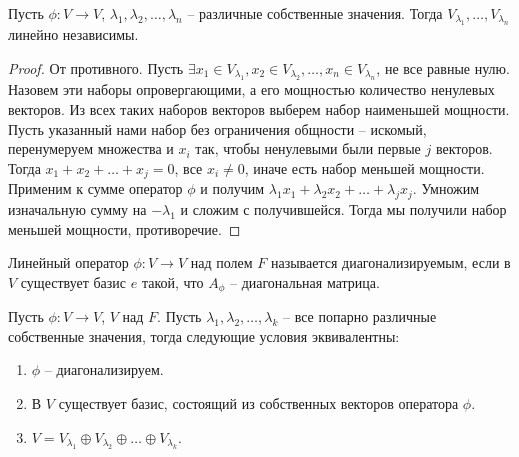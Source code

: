 \begin{theorem}
    \label{o_lnz}
    Пусть $\phi: V \to V$, $\lambda_1, \lambda_2, \dots, \lambda_n$ -- различные собственные значения. 
    Тогда $V_{\lambda_1}, \ldots, V_{\lambda_n}$ линейно независимы.
\end{theorem}

\begin{proof}
    От противного. Пусть $\exists x_1 \in V_{\lambda_1}, x_2 \in V_{\lambda_2}, \dots, 
    x_n \in V_{\lambda_n}$, не все равные нулю. 
    Назовем эти наборы опровергающими, а его мощностью количество ненулевых векторов. 
    Из всех таких наборов векторов выберем набор наименьшей мощности. Пусть 
    указанный нами набор без ограничения общности -- искомый, перенумеруем множества и $x_i$ так,
    чтобы ненулевыми были первые $j$ векторов. Тогда $x_1 + x_2 + \dots + x_j = 0$, все
    $x_i \neq 0$, иначе есть набор меньшей мощности. Применим к сумме оператор $\phi$ и получим $\lambda_1 x_1 + \lambda_2 x_2 + \ldots + \lambda_j x_j$. Умножим изначальную сумму на $-\lambda_1$
    и сложим с получившейся. Тогда мы получили набор меньшей мощности, противоречие.
\end{proof}

\begin{definition}
    Линейный оператор $\phi: V \to V$ над полем $F$ называется диагонализируемым, если в $V$ 
    существует базис $e$ такой, что $A_{\phi}$ -- диагональная матрица.
\end{definition}

\begin{theorem}
    \label{theorem4.1}
    Пусть $\phi: V \to V$, $V$ над $F$. Пусть $\lambda_1, \lambda_2, \dots, \lambda_k$ -- все 
    попарно различные собственные значения, тогда следующие условия эквивалентны:
    \begin{enumerate}
        \item $\phi$ -- диагонализируем.
        \item В $V$ существует базис, состоящий из собственных векторов оператора $\phi$.
        \item $V = V_{\lambda_1} \oplus V_{\lambda_2} \oplus \dots \oplus V_{\lambda_k}$.
    \end{enumerate}
\end{theorem}

